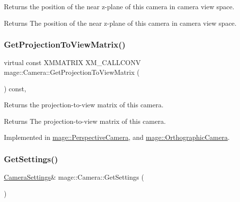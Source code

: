 Returns the position of the near z-\/plane of this camera in camera view space.

\begin{DoxyReturn}{Returns}
The position of the near z-\/plane of this camera in camera view space. 
\end{DoxyReturn}
\hypertarget{classmage_1_1_camera_a9259dee9eeee754a1392cca88f428d29}{}\label{classmage_1_1_camera_a9259dee9eeee754a1392cca88f428d29} 
\subsubsection{\texorpdfstring{Get\+Projection\+To\+View\+Matrix()}{GetProjectionToViewMatrix()}}
{\footnotesize\ttfamily virtual const X\+M\+M\+A\+T\+R\+IX X\+M\+\_\+\+C\+A\+L\+L\+C\+O\+NV mage\+::\+Camera\+::\+Get\+Projection\+To\+View\+Matrix (\begin{DoxyParamCaption}{ }\end{DoxyParamCaption}) const\hspace{0.3cm}{\ttfamily [pure virtual]}, {\ttfamily [noexcept]}}

Returns the projection-\/to-\/view matrix of this camera.

\begin{DoxyReturn}{Returns}
The projection-\/to-\/view matrix of this camera. 
\end{DoxyReturn}


Implemented in \hyperlink{classmage_1_1_perspective_camera_ac0353864cc0eafe5ea6af54b2b860992}{mage\+::\+Perspective\+Camera}, and \hyperlink{classmage_1_1_orthographic_camera_a7bbc235a85877c12b60d1a56d5b65108}{mage\+::\+Orthographic\+Camera}.

\hypertarget{classmage_1_1_camera_af4077967b2b676bc66226fd7a5d15220}{}\label{classmage_1_1_camera_af4077967b2b676bc66226fd7a5d15220} 
\subsubsection{\texorpdfstring{Get\+Settings()}{GetSettings()}\hspace{0.1cm}{\footnotesize\ttfamily [1/2]}}
{\footnotesize\ttfamily \hyperlink{classmage_1_1_camera_settings}{Camera\+Settings}\& mage\+::\+Camera\+::\+Get\+Settings (\begin{DoxyParamCaption}{ }\end{DoxyParamCaption})\hspace{0.3cm}{\ttfamily [noexcept]}}

